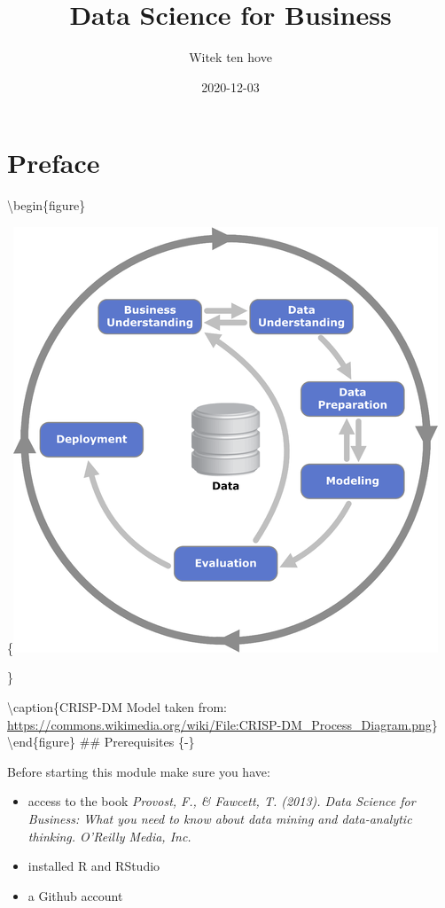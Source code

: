\documentclass[
]{book}
\title{Data Science for Business}
\author{Witek ten hove}
\date{2020-12-03}
\providecommand{\tightlist}{%
  \setlength{\itemsep}{0pt}\setlength{\parskip}{0pt}}
\begin{document}
\maketitle

{
\setcounter{tocdepth}{1}
\tableofcontents
}
\hypertarget{preface}{%
\chapter*{Preface}\label{preface}}

\textbackslash begin\{figure\}

\{\centering \includegraphics[width=0.8\linewidth]{images/crisp}

\}

\textbackslash caption\{CRISP-DM Model taken from: \url{https://commons.wikimedia.org/wiki/File:CRISP-DM_Process_Diagram.png}\}\label{fig:title-fig}
\textbackslash end\{figure\}
\#\# Prerequisites \{-\}

Before starting this module make sure you have:

\begin{itemize}
\tightlist
\item
  access to the book \emph{Provost, F., \& Fawcett, T. (2013). Data Science for Business: What you need to know about data mining and data-analytic thinking. O'Reilly Media, Inc.}
\item
  installed R and RStudio
\item
  a Github account
\end{itemize}
\end{document}

